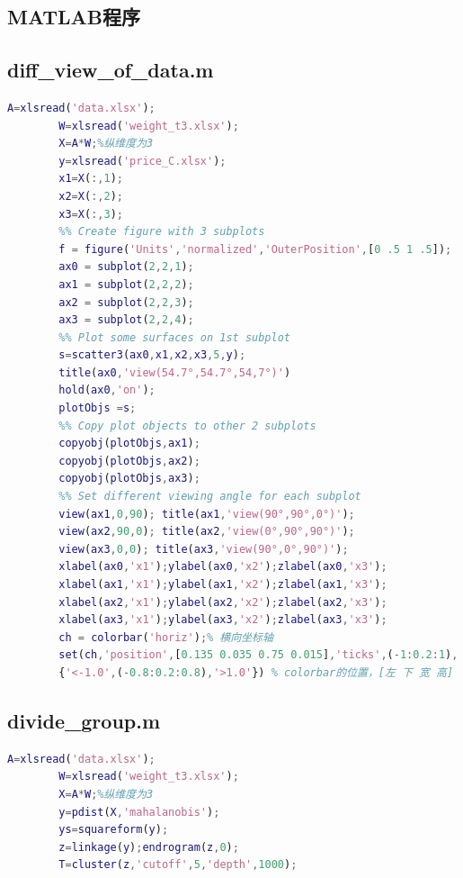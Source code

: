 \documentclass[withoutpreface,bwprint]{cumcmthesis} %
\begin{document}
\begin{appendices}
    \section{MATLAB程序}

    \subsection{diff\_view\_of\_data.m}

    \begin{lstlisting}[language=MATLAB]
        A=xlsread('data.xlsx');
        W=xlsread('weight_t3.xlsx');
        X=A*W;%纵维度为3
        y=xlsread('price_C.xlsx');
        x1=X(:,1);
        x2=X(:,2);
        x3=X(:,3);
        %% Create figure with 3 subplots
        f = figure('Units','normalized','OuterPosition',[0 .5 1 .5]);
        ax0 = subplot(2,2,1);
        ax1 = subplot(2,2,2);
        ax2 = subplot(2,2,3);
        ax3 = subplot(2,2,4);
        %% Plot some surfaces on 1st subplot
        s=scatter3(ax0,x1,x2,x3,5,y);
        title(ax0,'view(54.7°,54.7°,54,7°)')
        hold(ax0,'on');
        plotObjs =s;
        %% Copy plot objects to other 2 subplots
        copyobj(plotObjs,ax1);
        copyobj(plotObjs,ax2);
        copyobj(plotObjs,ax3);
        %% Set different viewing angle for each subplot
        view(ax1,0,90); title(ax1,'view(90°,90°,0°)');
        view(ax2,90,0); title(ax2,'view(0°,90°,90°)');
        view(ax3,0,0); title(ax3,'view(90°,0°,90°)');
        xlabel(ax0,'x1');ylabel(ax0,'x2');zlabel(ax0,'x3');
        xlabel(ax1,'x1');ylabel(ax1,'x2');zlabel(ax1,'x3');
        xlabel(ax2,'x1');ylabel(ax2,'x2');zlabel(ax2,'x3');
        xlabel(ax3,'x1');ylabel(ax3,'x2');zlabel(ax3,'x3');
        ch = colorbar('horiz');% 横向坐标轴
        set(ch,'position',[0.135 0.035 0.75 0.015],'ticks',(-1:0.2:1),'ticklength',0.015,'fontsize',10,'ticklabels',
        {'<-1.0',(-0.8:0.2:0.8),'>1.0'}) % colorbar的位置，[左 下 宽 高]
    \end{lstlisting}

    \subsection{divide\_group.m}

    \begin{lstlisting}[language=MATLAB]
        A=xlsread('data.xlsx');
        W=xlsread('weight_t3.xlsx');
        X=A*W;%纵维度为3
        y=pdist(X,'mahalanobis');
        ys=squareform(y);
        z=linkage(y);endrogram(z,0);
        T=cluster(z,'cutoff',5,'depth',1000);
    \end{lstlisting}


\end{appendices}
\end{document}
